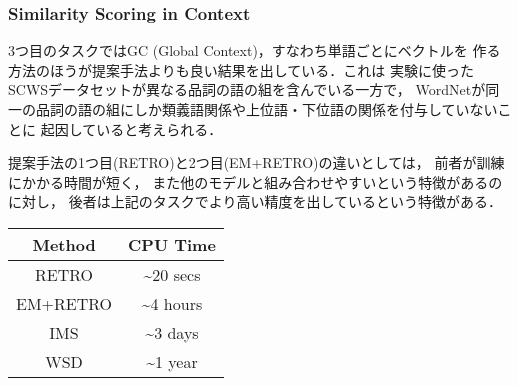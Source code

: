 \documentclass[10pt,usepdftitle=false,hyperref={unicode}]{beamer}
\begin{document}
\begin{frame}
\frametitle{Similarity Scoring in Context}
3つ目のタスクではGC (Global Context)，すなわち単語ごとにベクトルを
作る方法のほうが提案手法よりも良い結果を出している．これは
実験に使ったSCWSデータセットが異なる品詞の語の組を含んでいる一方で，
WordNetが同一の品詞の語の組にしか類義語関係や上位語・下位語の関係を付与していないことに
起因していると考えられる．

\bigskip

提案手法の1つ目(RETRO)と2つ目(EM+RETRO)の違いとしては，
前者が訓練にかかる時間が短く，
また他のモデルと組み合わせやすいという特徴があるのに対し，
後者は上記のタスクでより高い精度を出しているという特徴がある．

        \begin{center}
            \begin{algfont}
                {\renewcommand{\arraystretch}{1.5}
                    {\scriptsize
                        \begin{tabular}{|c|c|}
                            \hline
                            Method & CPU Time \\
                            \hline
                            RETRO    & {\textasciitilde}20 secs \\
                            EM+RETRO & {\textasciitilde}4 hours \\
                            IMS      & {\textasciitilde}3 days  \\
                            WSD      & {\textasciitilde}1 year \\
                            \hline
                        \end{tabular}
                    }
                }
            \end{algfont}
        \end{center}
\end{frame}
\end{document}
